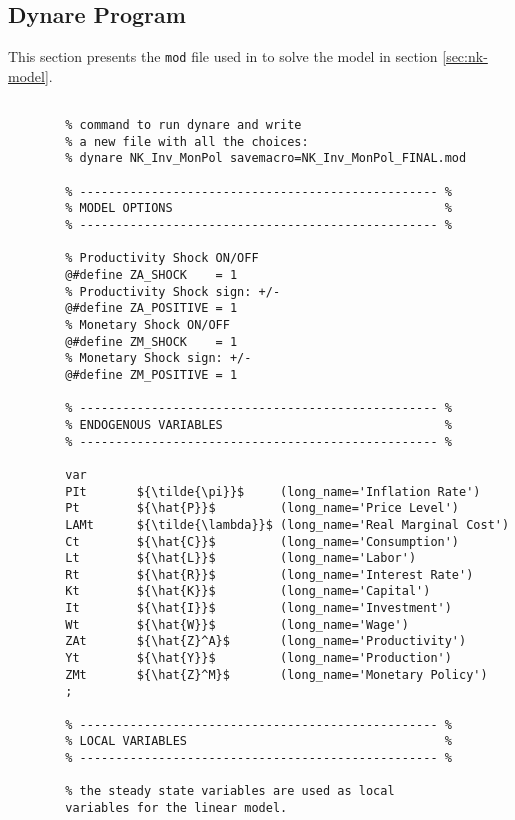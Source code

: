 \documentclass[
thesis.tex
]{subfiles}
\begin{document}
\newpage

\subsection{Dynare Program}

This section presents the \texttt{mod} file used in \dynare to solve the model in section \ref{sec:nk-model}.

\vspace*{-0.5cm}

{\singlespacing
	
	\begin{verbatim} 
		
		% command to run dynare and write
		% a new file with all the choices:
		% dynare NK_Inv_MonPol savemacro=NK_Inv_MonPol_FINAL.mod
		
		% -------------------------------------------------- %
		% MODEL OPTIONS                                      %
		% -------------------------------------------------- %
		
		% Productivity Shock ON/OFF
		@#define ZA_SHOCK    = 1
		% Productivity Shock sign: +/-
		@#define ZA_POSITIVE = 1
		% Monetary Shock ON/OFF
		@#define ZM_SHOCK    = 1
		% Monetary Shock sign: +/-
		@#define ZM_POSITIVE = 1
		
		% -------------------------------------------------- %
		% ENDOGENOUS VARIABLES                               %
		% -------------------------------------------------- %
		
		var
		PIt       ${\tilde{\pi}}$     (long_name='Inflation Rate')
		Pt        ${\hat{P}}$         (long_name='Price Level')
		LAMt      ${\tilde{\lambda}}$ (long_name='Real Marginal Cost')
		Ct        ${\hat{C}}$         (long_name='Consumption')
		Lt        ${\hat{L}}$         (long_name='Labor')
		Rt        ${\hat{R}}$         (long_name='Interest Rate')
		Kt        ${\hat{K}}$         (long_name='Capital')
		It        ${\hat{I}}$         (long_name='Investment')
		Wt        ${\hat{W}}$         (long_name='Wage')
		ZAt       ${\hat{Z}^A}$       (long_name='Productivity')
		Yt        ${\hat{Y}}$         (long_name='Production')
		ZMt       ${\hat{Z}^M}$       (long_name='Monetary Policy')
		;
		
		% -------------------------------------------------- %
		% LOCAL VARIABLES                                    %
		% -------------------------------------------------- %
		
		% the steady state variables are used as local 
		variables for the linear model.
		

\end{verbatim}}
\end{document}
